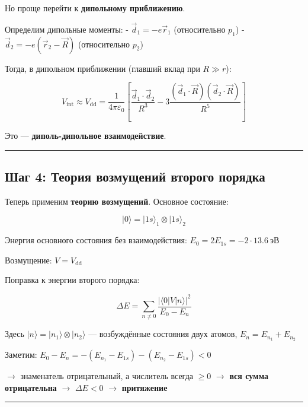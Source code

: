 \documentclass[11pt]{article}
\begin{document}
Но проще перейти к \textbf{дипольному приближению}.

Определим дипольные моменты: - \(\vec{d}_1 = -e \vec{r}_1\)
(относительно \(p_1\)) - \(\vec{d}_2 = -e (\vec{r}_2 - \vec{R})\)
(относительно \(p_2\))

Тогда, в дипольном приближении (главший вклад при \(R \gg r\)):

\[
V_{\text{int}} \approx V_{\text{dd}} = \frac{1}{4\pi\varepsilon_0} \left[
\frac{\vec{d}_1 \cdot \vec{d}_2}{R^3} - 3 \frac{(\vec{d}_1 \cdot \vec{R})(\vec{d}_2 \cdot \vec{R})}{R^5}
\right]
\]

Это --- \textbf{диполь-дипольное взаимодействие}.

\begin{center}\rule{0.5\linewidth}{\linethickness}\end{center}

\subsection{Шаг 4: Теория возмущений второго
порядка}\label{ux448ux430ux433-4-ux442ux435ux43eux440ux438ux44f-ux432ux43eux437ux43cux443ux449ux435ux43dux438ux439-ux432ux442ux43eux440ux43eux433ux43e-ux43fux43eux440ux44fux434ux43aux430}

Теперь применим \textbf{теорию возмущений}. Основное состояние:

\[
|0\rangle = |1s\rangle_1 \otimes |1s\rangle_2
\]

Энергия основного состояния без взаимодействия:
\(E_0 = 2E_{1s} = -2 \cdot 13.6~\text{эВ}\)

Возмущение: \(V = V_{\text{dd}}\)

Поправка к энергии второго порядка:

\[
\Delta E = \sum_{n \neq 0} \frac{ |\langle 0 | V | n \rangle|^2 }{E_0 - E_n}
\]

Здесь \(|n\rangle = |n_1\rangle \otimes |n_2\rangle\) --- возбуждённые
состояния двух атомов, \(E_n = E_{n_1} + E_{n_2}\)

Заметим: \(E_0 - E_n = - (E_{n_1} - E_{1s}) - (E_{n_2} - E_{1s}) < 0\)

$\rightarrow$ знаменатель отрицательный, а числитель всегда \(\geq 0\)
$\rightarrow$ \textbf{вся сумма отрицательна} $\rightarrow$
\(\Delta E < 0\) $\rightarrow$ \textbf{притяжение}

\begin{center}\rule{0.5\linewidth}{\linethickness}\end{center}
\end{document}
